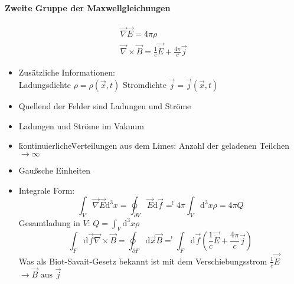 \documentclass[a4paper]{article}
\begin{document}
\paragraph{Zweite Gruppe der Maxwellgleichungen}
\begin{align}
\vec{\nabla}\vec{E}=4\pi\rho\\
\vec{\nabla}\times\vec{B}=\frac{1}{c}\vec{\ddot{E}}+\frac{4\pi}{c}\vec{j}
\end{align}
\begin{itemize}
  \item Zusätzliche Informationen: \\
   Ladungsdichte $\rho=\rho(\vec{x},t)$
   Stromdichte $\vec{j}=\vec{j}(\vec{x},t)$
  \item Quellend der Felder sind Ladungen und Ströme
  \item Ladungen und Ströme im Vakuum
  \item \"kontinuierliche\" Verteilungen aus dem Limes: Anzahl der geladenen
  Teilchen $\rightarrow \infty$
  \item Gaußsche Einheiten
  \item Integrale Form: \begin{equation}
  \int_V\vec{\nabla}\vec{E}\mathrm{d}^3x=\oint_{\partial V}\vec{E}\mathrm{d}\vec{f}=^!
  4\pi\int_V\mathrm{d}^3x\rho =4\pi Q
  \end{equation} 
  Gesamtladung in $V$: $Q=\int_V \mathrm{d}^3x \rho$
  \begin{equation}
  \int_F \mathrm{d}\vec{f}\vec{\nabla}\times\vec{B}=\oint_{\partial F}\mathrm{d}\vec{x}\vec{B}=^!
  \int_F\mathrm{d}\vec{f}(\frac{1}{c}\vec{\ddot{E}}+\frac{4\pi}{c}\vec{j})
  \end{equation}
  Was als Biot-Savait-Gesetz bekannt ist mit dem Verschiebungsstrom
  $\frac{1}{c}\vec{\ddot{E}}$ \\
  $\rightarrow \vec{B} \text{ aus } \vec{j}$
\end{itemize}
\end{document}
